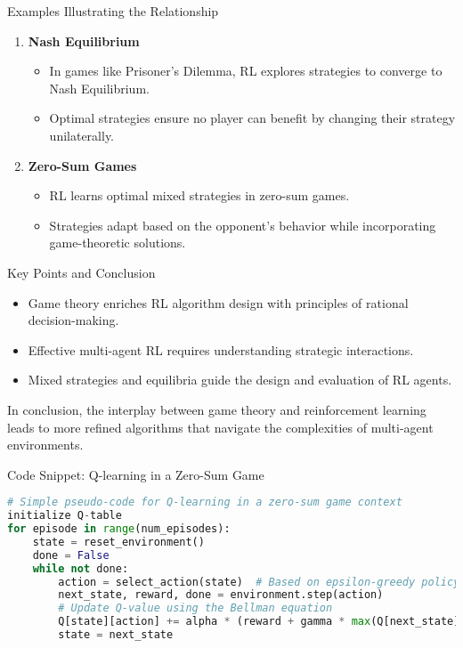 \documentclass[aspectratio=169]{beamer}
\begin{document}
\begin{frame}[fragile]{Examples Illustrating the Relationship}
    \begin{enumerate}
        \item \textbf{Nash Equilibrium}
            \begin{itemize}
                \item In games like Prisoner's Dilemma, RL explores strategies to converge to Nash Equilibrium.
                \item Optimal strategies ensure no player can benefit by changing their strategy unilaterally.
            \end{itemize}
        \item \textbf{Zero-Sum Games}
            \begin{itemize}
                \item RL learns optimal mixed strategies in zero-sum games.
                \item Strategies adapt based on the opponent’s behavior while incorporating game-theoretic solutions.
            \end{itemize}
    \end{enumerate}
\end{frame}

\begin{frame}[fragile]{Key Points and Conclusion}
    \begin{itemize}
        \item Game theory enriches RL algorithm design with principles of rational decision-making.
        \item Effective multi-agent RL requires understanding strategic interactions.
        \item Mixed strategies and equilibria guide the design and evaluation of RL agents.
    \end{itemize}
    
    In conclusion, the interplay between game theory and reinforcement learning leads to more refined algorithms that navigate the complexities of multi-agent environments.
\end{frame}

\begin{frame}[fragile]{Code Snippet: Q-learning in a Zero-Sum Game}
    \begin{lstlisting}[language=Python]
# Simple pseudo-code for Q-learning in a zero-sum game context
initialize Q-table
for episode in range(num_episodes):
    state = reset_environment()
    done = False
    while not done:
        action = select_action(state)  # Based on epsilon-greedy policy
        next_state, reward, done = environment.step(action)
        # Update Q-value using the Bellman equation
        Q[state][action] += alpha * (reward + gamma * max(Q[next_state]) - Q[state][action])
        state = next_state
    \end{lstlisting}
\end{frame}
\end{document}
